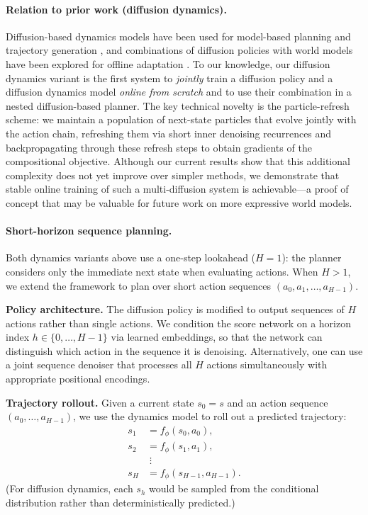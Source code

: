 \documentclass{article}
\theoremstyle{plain}
\theoremstyle{definition}
\theoremstyle{remark}
\begin{document}
\paragraph{Relation to prior work (diffusion dynamics).}
Diffusion-based dynamics models have been used for model-based planning and trajectory generation \citep{rigter2023worldmodels}, and combinations of diffusion policies with world models have been explored for offline adaptation \citep{diwa2025}.
To our knowledge, our diffusion dynamics variant is the first system to \emph{jointly} train a diffusion policy and a diffusion dynamics model \emph{online from scratch} and to use their combination in a nested diffusion-based planner.
The key technical novelty is the particle-refresh scheme: we maintain a population of next-state particles that evolve jointly with the action chain, refreshing them via short inner denoising recurrences and backpropagating through these refresh steps to obtain gradients of the compositional objective.
Although our current results show that this additional complexity does not yet improve over simpler methods, we demonstrate that stable online training of such a multi-diffusion system is achievable---a proof of concept that may be valuable for future work on more expressive world models.

\paragraph{Short-horizon sequence planning.}
Both dynamics variants above use a one-step lookahead ($H=1$): the planner considers only the immediate next state when evaluating actions.
When $H>1$, we extend the framework to plan over short action sequences $(a_0, a_1, \dots, a_{H-1})$.

\textbf{Policy architecture.}
The diffusion policy is modified to output sequences of $H$ actions rather than single actions.
We condition the score network on a horizon index $h \in \{0, \dots, H-1\}$ via learned embeddings, so that the network can distinguish which action in the sequence it is denoising.
Alternatively, one can use a joint sequence denoiser that processes all $H$ actions simultaneously with appropriate positional encodings.

\textbf{Trajectory rollout.}
Given a current state $s_0 = s$ and an action sequence $(a_0, \dots, a_{H-1})$, we use the dynamics model to roll out a predicted trajectory:
\begin{equation}
\begin{aligned}
  s_1 &= f_\phi(s_0, a_0), \\
  s_2 &= f_\phi(s_1, a_1), \\
  &\;\vdots \\
  s_H &= f_\phi(s_{H-1}, a_{H-1}).
\end{aligned}
\end{equation}
(For diffusion dynamics, each $s_h$ would be sampled from the conditional distribution rather than deterministically predicted.)
\end{document}
